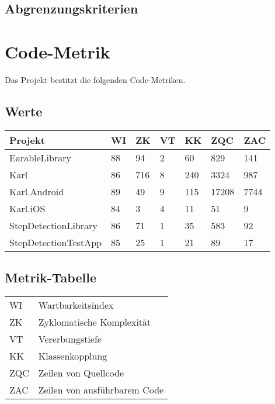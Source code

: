 \documentclass[../implementierung.tex]{subfiles}
\begin{document}
		\subsection{Abgrenzungskriterien}
			\begin{itemize}
			\end{itemize}

	\section{Code-Metrik}
		Das Projekt bestitzt die folgenden Code-Metriken.
		\subsection{Werte}
		\begin{tabular}{l|l|l|l|l|l|l}
			Projekt & WI & ZK & VT & KK & ZQC & ZAC \\
			\hline
			EarableLibrary & 88 & 94 & 2 & 60 & 829 & 141 \\
			Karl & 86 & 716 & 8 & 240 & 3324 & 987 \\
			Karl.Android & 89 & 49 & 9 & 115 & 17208 & 7744 \\
			Karl.iOS & 84 & 3 & 4 & 11 & 51 & 9 \\
			StepDetectionLibrary & 86 & 71 & 1 & 35 & 583 & 92 \\
			StepDetectionTestApp & 85 & 25 & 1 & 21 & 89 & 17 \\
		\end{tabular}
		\subsection{Metrik-Tabelle}
		\begin{tabular}{l|l}
			WI & Wartbarkeitsindex \\
			ZK & Zyklomatische Komplexität \\
			VT & Vererbungstiefe \\
			KK & Klassenkopplung \\
			ZQC & Zeilen von Quellcode \\
			ZAC & Zeilen von ausführbarem Code \\
		\end{tabular}
		\\
		\\
\end{document}
